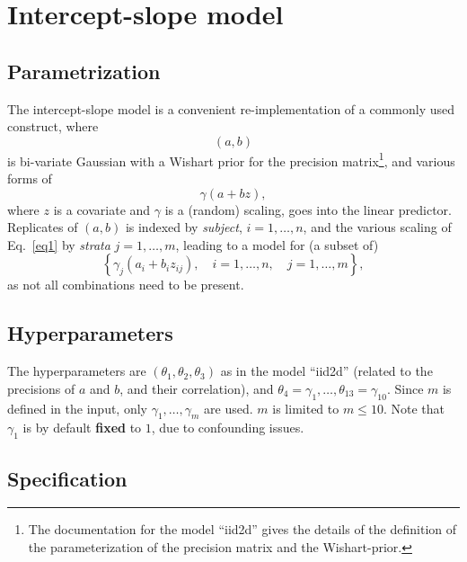 \documentclass[a4paper,11pt]{article}
\begin{document}
\section*{Intercept-slope model}

\subsection*{Parametrization}

The intercept-slope model is a convenient re-implementation of a
commonly used construct, where
\begin{displaymath}
    (a,b)
\end{displaymath}
is bi-variate Gaussian with a Wishart prior for the precision
matrix\footnote{The documentation for the model ``iid2d'' gives the
    details of the definition of the parameterization of the precision
    matrix and the Wishart-prior.}, and various forms of
\begin{equation}\label{eq1}%
    \gamma(a + bz),
\end{equation}
where $z$ is a covariate and $\gamma$ is a (random) scaling, goes into
the linear predictor. Replicates of $(a,b)$ is indexed by
\emph{subject}, $i=1, \ldots, n$, and the various scaling of
Eq.~\ref{eq1} by \emph{strata} $j=1, \ldots, m$, leading to a model
for (a subset of)
\begin{displaymath}
    \left\{\gamma_j(a_i + b_i z_{ij}), \quad i=1, \ldots,n, \quad j=1,\ldots,m\right\},
\end{displaymath}
as not all combinations need to be present.

\subsection*{Hyperparameters}

The hyperparameters are $(\theta_1,\theta_2,\theta_3)$ as in the model
``iid2d'' (related to the precisions of $a$ and $b$, and their
correlation), and
$\theta_4=\gamma_1, \ldots, \theta_{13}=\gamma_{10}$. Since $m$ is
defined in the input, only $\gamma_1, \ldots, \gamma_m$ are used. $m$
is limited to $m \le 10$. Note that $\gamma_1$ is by default
\textbf{fixed} to $1$, due to confounding issues. 


\subsection*{Specification}
\end{document}
